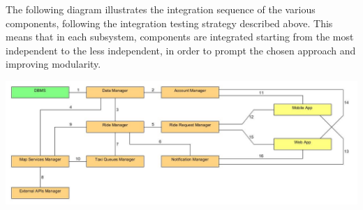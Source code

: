 The following diagram illustrates the integration sequence of the various components, following the integration testing strategy described above. This means that in each subsystem, components are integrated starting from the most independent to the less independent, in order to prompt the chosen approach and improving modularity.

\begin{center}
	\includegraphics[width=\textwidth]{diagrams/SoftwareIntegrationDiagram.jpg}
\end{center}